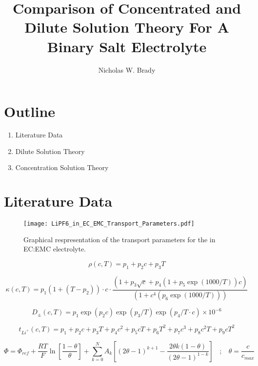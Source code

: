 \documentclass[12pt]{article}
\title{Comparison of Concentrated and Dilute Solution Theory For A Binary Salt Electrolyte}
\author[1]{Nicholas W. Brady}
\affil[1]{University of Hasselt, Hasselt 3500, Belgium}
\begin{document}
	\maketitle

	\clearpage

  	\section*{Outline}

  		\begin{enumerate}
	  		\item Literature Data
			\item Dilute Solution Theory
			\item Concentration Solution Theory
		\end{enumerate}

	\clearpage
	\section*{Literature Data}

	\begin{figure}[h]
		\centering
		\texttt{[image: LiPF6\_in\_EC\_EMC\_Transport\_Parameters.pdf]}
		\caption{Graphical respresentation of the transport parameters for the  in EC:EMC electrolyte.}
		\label{fig:TransportParameters_EC_EMC}
	\end{figure}

	\begin{equation}
		\rho(c,T) = p_1 + p_2c + p_3T
	\end{equation}

	\begin{equation}
		\kappa(c,T) = p_1(1 + (T-p_2)) \cdot c \cdot \frac{(1 + p_3 \sqrt{c} + p_4(1 + p_5\exp(1000/T))c )} {(1 + c^4(p_6\exp(1000/T)))}
	\end{equation}

	\begin{equation}
		D_{\pm}(c,T) = p_1\exp(p_2c) \exp(p_3/T) \exp(p_4/T \cdot c) \times 10^{-6}
	\end{equation}

	\begin{equation}
		t_{Li^+}(c,T) = p_1 + p_2 c + p_3 T + p_4 c^2 + p_5 c T + p_6 T^2 + p_7 c^3 + p_8 c^2 T + p_9 c T^2
	\end{equation}

	\begin{equation}
		\Phi = \Phi_{ref} + \frac{R T}{F} \ln{\left[\frac{1 - \theta}{\theta} \right]} + \sum_{k=0}^{N} A_k \left[ (2\theta - 1)^{k+1} - \frac{2\theta k(1 - \theta)}{(2\theta - 1)^{1-k}} \right] \ \ \ \ ; \ \ \ \ \theta = \frac{c}{c_{max}}
	\end{equation}
\end{document}
